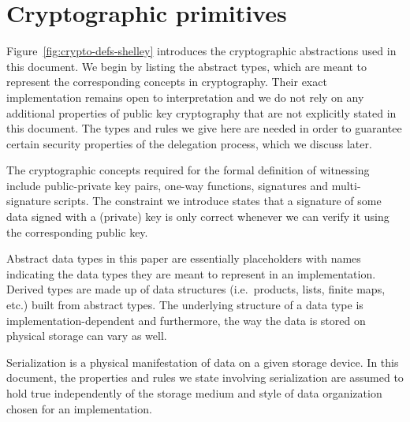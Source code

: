 \section{Cryptographic primitives}
\label{sec:crypto-primitives-shelley}

Figure~\ref{fig:crypto-defs-shelley} introduces the cryptographic abstractions used in
this document. We begin by listing the abstract types, which are meant to
represent the corresponding concepts in cryptography.
Their exact
implementation remains open to interpretation and we do not rely on
any additional properties of public key cryptography that are not explicitly stated
in this document. The types and rules we give here are needed in
order to guarantee certain security properties of the delegation process, which
we discuss later.

The cryptographic concepts required for the formal definition of witnessing
include public-private key pairs, one-way functions, signatures and
multi-signature scripts. The constraint we introduce states that a signature of
some data signed with a (private) key is only correct whenever we can verify it
using the corresponding public key.

Abstract data types in this paper are essentially placeholders with names
indicating the data types they are meant to represent in an implementation.
Derived types are made up of data structures (i.e.~products, lists, finite
maps, etc.) built from abstract types. The underlying structure of a data type
is implementation-dependent and furthermore, the way the data is stored on
physical storage can vary as well.

Serialization is a physical manifestation of data on a given storage device.
In this document, the properties and rules we state involving serialization are
assumed to hold true independently of the storage medium and style of data
organization chosen for an implementation.

